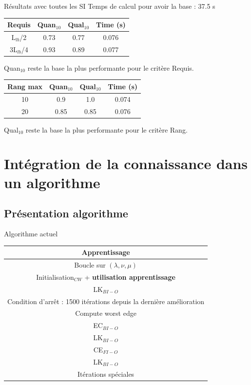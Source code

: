 \documentclass{beamer}
\begin{document}
\begin{frame}{Résultats avec toutes les SI}
Temps de calcul pour avoir la base : 37.5 s

\centering
\begin{tabular}{|c|c|c|c|}
   \hline
   Requis & Quan$_{10}$ & Qual$_{10}$ & Time (s)\\
   \hline
   L$_{lb}$/2 & 0.73 & 0.77 & 0.076 \\
   \hline
   3L$_{lb}$/4 & 0.93 & 0.89  & 0.077 \\
   \hline
\end{tabular}

Quan$_{10}$ reste la base la plus performante pour le critère Requis.

\begin{tabular}{|c|c|c|c|}
   \hline
   Rang max & Quan$_{10}$ & Qual$_{10}$ & Time (s)\\
   \hline
   10 & 0.9 & 1.0 & 0.074 \\
   \hline
   20 & 0.85 & 0.85 & 0.076 \\
   \hline
\end{tabular}

Qual$_{10}$ reste la base la plus performante pour le critère Rang.
\end{frame}

\section{Intégration de la connaissance dans un algorithme}

\subsection{Présentation algorithme}
\begin{frame}{Algorithme actuel}

\begin{center}
\begin{tabular}{|c|}
	\hline
 	\textbf{Apprentissage} \\
   \hline
   Boucle sur $(\lambda, \nu, \mu)$ \\
   \hline
   \hline
   Initialisation$_{CW}$ + \textbf{utilisation apprentissage} \\
   \hline
   LK$_{BI-O}$ \\
   \hline
   \hline
   Condition d'arrêt : 1500 itérations depuis la dernière amélioration  \\
   \hline
   Compute worst edge \\
   \hline
   EC$_{BI-O}$ \\
   \hline
   LK$_{BI-O}$ \\
   \hline
   CE$_{FI-O}$ \\
   \hline
   LK$_{BI-O}$ \\
   \hline
   Itérations spéciales \\
   \hline
   \hline

\end{tabular}
\end{center}
\end{frame}
\end{document}

